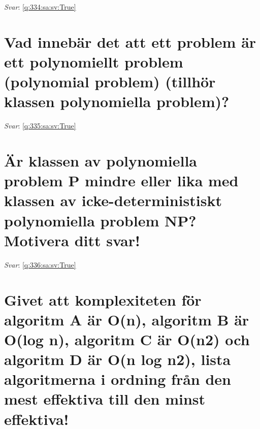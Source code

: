 \documentclass[a4paper,11pt,oneside]{book}
\begin{document}
\begin{sloppypar}
\label{q:334:sa:sv:False}

\vspace{2cm}

\noindent\makebox[\textwidth]{\hrulefill}

\vspace{1cm}

\textit{Svar}: \autoref{q:334:sa:sv:True}



\section{Vad inneb\"ar det att ett problem \"ar ett polynomiellt problem (polynomial problem) (tillh\"or klassen polynomiella problem)?}

\label{q:335:sa:sv:False}

\vspace{2cm}

\noindent\makebox[\textwidth]{\hrulefill}

\vspace{1cm}

\textit{Svar}: \autoref{q:335:sa:sv:True}



\section{\"Ar klassen av polynomiella problem P mindre eller lika med klassen av icke-deterministiskt polynomiella problem NP? Motivera ditt svar!}

\label{q:336:sa:sv:False}

\vspace{2cm}

\noindent\makebox[\textwidth]{\hrulefill}

\vspace{1cm}

\textit{Svar}: \autoref{q:336:sa:sv:True}



\section{Givet att komplexiteten f\"or algoritm A \"ar O(n), algoritm B \"ar O(log n), algoritm C \"ar O(n2) och algoritm D \"ar O(n log n2), lista algoritmerna i ordning fr\r{a}n den mest effektiva till den minst effektiva!}

\label{q:337:sa:sv:False}

\vspace{2cm}


\end{sloppypar}
\end{document}
